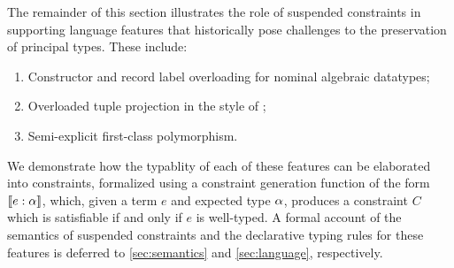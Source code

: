 \documentclass[acmsmall,screen,nonacm]{acmart}
\begin{document}

The remainder of this section illustrates the role of suspended constraints
in supporting language features that historically pose challenges to the
preservation of principal types.
These include:
\begin{enumerate}
  \item Constructor and record label overloading for nominal algebraic
  datatypes;  
  \item Overloaded tuple projection in the style of \SML; 
  \item Semi-explicit first-class polymorphism.
\end{enumerate}
We demonstrate how the typablity of each of these features can be elaborated
into constraints, formalized using a constraint generation function of the
form $\llbracket e : \alpha\rrbracket$, which, given a term $e$ and expected type $\alpha$,
produces a constraint $C$ which is satisfiable if and only if $e$ is
well-typed. A formal account of the semantics of suspended constraints and
the declarative typing rules for these features is deferred to 
\cref{sec:semantics} and \cref{sec:language}, respectively.


\end{document}
